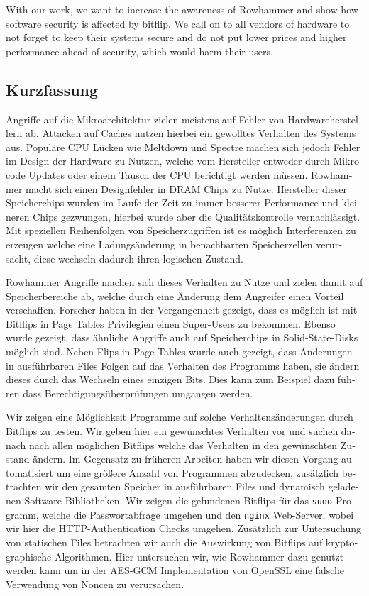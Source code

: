 With our work, we want to increase the awareness of Rowhammer and show how
software security is affected by bitflip. We call on to all vendors of hardware
to not forget to keep their systems secure and do not put lower prices and
higher performance ahead of security, which would harm their users.
\cleardoublepage
{}
{}
\begin{otherlanguage}{ngerman}
\chapter*{Kurzfassung}
\label{cha:kurzfassung}

Angriffe auf die Mikroarchitektur zielen meistens auf Fehler von
Hardwareherstellern ab. Attacken auf Caches nutzen hierbei ein gewolltes
Verhalten des Systems aus. Populäre CPU Lücken wie Meltdown und Spectre machen
sich jedoch Fehler im Design der Hardware zu Nutzen, welche vom Hersteller
entweder durch Mikrocode Updates oder einem Tausch der CPU berichtigt werden
müssen. Rowhammer macht sich einen Designfehler in DRAM Chips zu Nutze.
Hersteller dieser Speicherchips wurden im Laufe der Zeit zu immer besserer
Performance und kleineren Chips gezwungen, hierbei wurde aber die
Qualitätskontrolle vernachlässigt. Mit speziellen Reihenfolgen von
Speicherzugriffen ist es möglich Interferenzen zu erzeugen welche eine
Ladungsänderung in benachbarten Speicherzellen verursacht, diese wechseln
dadurch ihren logischen Zustand.

Rowhammer Angriffe machen sich dieses Verhalten zu Nutze und zielen damit auf
Speicherbereiche ab, welche durch eine Änderung dem Angreifer einen Vorteil
verschaffen. Forscher haben in der Vergangenheit gezeigt, dass es möglich ist
mit Bitflips in Page Tables Privilegien einen Super-Users zu bekommen. Ebenso
wurde gezeigt, dass ähnliche Angriffe auch auf Speicherchips in
Solid-State-Disks möglich sind. Neben Flips in Page Tables wurde auch gezeigt,
dass Änderungen in ausführbaren Files Folgen auf das Verhalten des Programms
haben, sie ändern dieses durch das Wechseln eines einzigen Bits. Dies kann zum
Beispiel dazu führen dass Berechtigungsüberprüfungen umgangen werden.

Wir zeigen eine Möglichkeit Programme auf solche Verhaltensänderungen durch
Bitflips zu testen. Wir geben hier ein gewünschtes Verhalten vor und suchen
danach nach allen möglichen Bitflips welche das Verhalten in den gewünschten
Zustand ändern. Im Gegensatz zu früheren Arbeiten haben wir diesen Vorgang
automatisiert um eine größere Anzahl von Programmen abzudecken, zusätzlich
betrachten wir den gesamten Speicher in ausführbaren Files und dynamisch
geladenen Software-Bibliotheken. Wir zeigen die gefundenen Bitflips für das
\texttt{sudo} Programm, welche die Passwortabfrage umgehen und den
\texttt{nginx} Web-Server, wobei wir hier die HTTP-Authentication Checks
umgehen. Zusätzlich zur Untersuchung von statischen Files betrachten wir auch
die Auswirkung von Bitflips auf kryptographische Algorithmen. Hier untersuchen
wir, wie Rowhammer dazu genutzt werden kann um in der AES-GCM Implementation von
OpenSSL eine falsche Verwendung von Noncen zu verursachen.


\end{otherlanguage}
